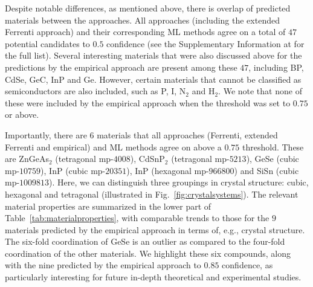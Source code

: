 \documentclass[superscriptaddress,
preprint,
 amsmath,amssymb,
 aps,
]{revtex4-2}
\begin{document}
Despite notable differences, as mentioned above, there is overlap of predicted materials between the approaches. 
All approaches (including the extended Ferrenti approach) and their corresponding ML methods agree on a total of $47$ potential candidates to $0.5$ confidence 
(see the Supplementary Information at \cite{supplementary} for the full list). 
Several interesting materials that were also discussed above for the predictions by the empirical approach are present among these $47$, including BP, CdSe, GeC, InP and Ge. However, certain materials that cannot be classified as semiconductors are also included, such as P, I, N$_2$ and H$_2$. We note that none of these were included by the empirical approach when the threshold was set to $0.75$ or above. 

Importantly, there are $6$ materials that all approaches (Ferrenti, extended Ferrenti and empirical) and ML methods agree on above a $0.75$ threshold. These are ZnGeAs$_2$ (tetragonal mp-$4008$), CdSnP$_2$ (tetragonal mp-$5213$), GeSe (cubic mp-$10759$), InP (cubic mp-$20351$), InP (hexagonal mp-$966800$) and SiSn (cubic mp-$1009813$). Here, we can distinguish three groupings in crystal structure: cubic, hexagonal and tetragonal (illustrated in Fig.~\ref{fig:crystalsystems}). The relevant material properties are summarized in the lower part of Table~\ref{tab:materialproperties}, 
with comparable trends to those for the $9$ materials predicted by the empirical approach in terms of, e.g., crystal structure. The six-fold coordination of GeSe is an outlier as compared to the four-fold coordination of the other materials.
We highlight these six compounds, along with the nine predicted by the empirical approach to $0.85$ confidence, as particularly interesting for future in-depth theoretical and experimental studies. 
\end{document}

